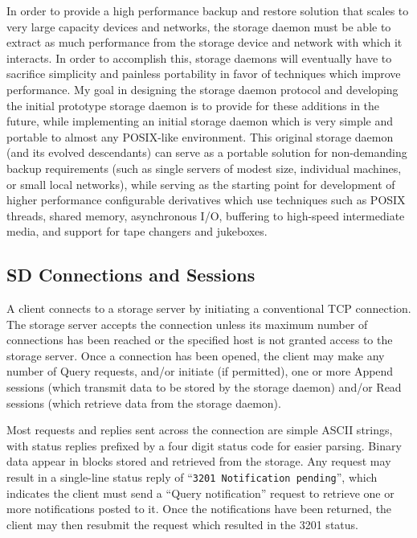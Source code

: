 In order to provide a high performance backup and restore solution that scales
to very large capacity devices and networks, the storage daemon must be able
to extract as much performance from the storage device and network with which
it interacts. In order to accomplish this, storage daemons will eventually
have to sacrifice simplicity and painless portability in favor of techniques
which improve performance. My goal in designing the storage daemon protocol
and developing the initial prototype storage daemon is to provide for these
additions in the future, while implementing an initial storage daemon which is
very simple and portable to almost any POSIX-like environment. This original
storage daemon (and its evolved descendants) can serve as a portable solution
for non-demanding backup requirements (such as single servers of modest size,
individual machines, or small local networks), while serving as the starting
point for development of higher performance configurable derivatives which use
techniques such as POSIX threads, shared memory, asynchronous I/O, buffering
to high-speed intermediate media, and support for tape changers and jukeboxes.


\subsection*{SD Connections and Sessions}

A client connects to a storage server by initiating a conventional TCP
connection. The storage server accepts the connection unless its maximum
number of connections has been reached or the specified host is not granted
access to the storage server. Once a connection has been opened, the client
may make any number of Query requests, and/or initiate (if permitted), one or
more Append sessions (which transmit data to be stored by the storage daemon)
and/or Read sessions (which retrieve data from the storage daemon). 

Most requests and replies sent across the connection are simple ASCII strings,
with status replies prefixed by a four digit status code for easier parsing.
Binary data appear in blocks stored and retrieved from the storage. Any
request may result in a single-line status reply of ``{\tt 3201\ Notification\
pending}'', which indicates the client must send a ``Query notification''
request to retrieve one or more notifications posted to it. Once the
notifications have been returned, the client may then resubmit the request
which resulted in the 3201 status. 

